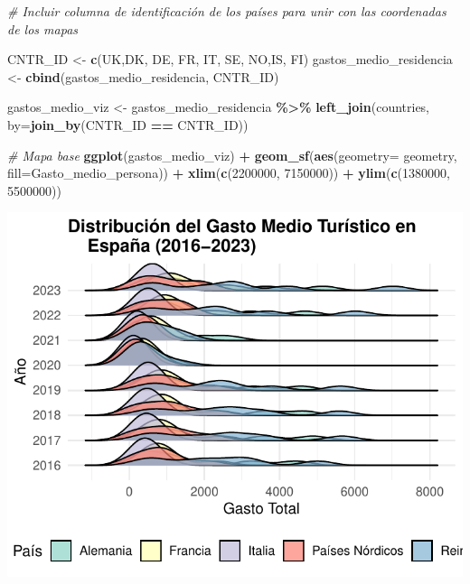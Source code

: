 \documentclass[data,article,submit,moreauthors,pdftex]{Definitions/mdpi}
\newenvironment{Shaded}{\begin{snugshade}}{\end{snugshade}}
\newcommand{\AttributeTok}[1]{\textcolor[rgb]{0.13,0.29,0.53}{#1}}
\newcommand{\CommentTok}[1]{\textcolor[rgb]{0.56,0.35,0.01}{\textit{#1}}}
\newcommand{\DecValTok}[1]{\textcolor[rgb]{0.00,0.00,0.81}{#1}}
\newcommand{\FunctionTok}[1]{\textcolor[rgb]{0.13,0.29,0.53}{\textbf{#1}}}
\newcommand{\NormalTok}[1]{#1}
\newcommand{\OtherTok}[1]{\textcolor[rgb]{0.56,0.35,0.01}{#1}}
\newcommand{\SpecialCharTok}[1]{\textcolor[rgb]{0.81,0.36,0.00}{\textbf{#1}}}
\newcommand{\StringTok}[1]{\textcolor[rgb]{0.31,0.60,0.02}{#1}}
\begin{document}
\begin{Shaded}
\begin{Highlighting}[]
\CommentTok{\# Incluir columna de identificación de los países para unir con las coordenadas de los mapas}

\NormalTok{CNTR\_ID }\OtherTok{\textless{}{-}} \FunctionTok{c}\NormalTok{(}\StringTok{\textquotesingle{}UK\textquotesingle{}}\NormalTok{,}\StringTok{\textquotesingle{}DK\textquotesingle{}}\NormalTok{, }\StringTok{\textquotesingle{}DE\textquotesingle{}}\NormalTok{, }\StringTok{\textquotesingle{}FR\textquotesingle{}}\NormalTok{, }\StringTok{\textquotesingle{}IT\textquotesingle{}}\NormalTok{, }\StringTok{\textquotesingle{}SE\textquotesingle{}}\NormalTok{, }\StringTok{\textquotesingle{}NO\textquotesingle{}}\NormalTok{,}\StringTok{\textquotesingle{}IS\textquotesingle{}}\NormalTok{, }\StringTok{\textquotesingle{}FI\textquotesingle{}}\NormalTok{)}
\NormalTok{gastos\_medio\_residencia }\OtherTok{\textless{}{-}} \FunctionTok{cbind}\NormalTok{(gastos\_medio\_residencia, CNTR\_ID)}


\NormalTok{gastos\_medio\_viz }\OtherTok{\textless{}{-}}\NormalTok{ gastos\_medio\_residencia }\SpecialCharTok{\%\textgreater{}\%} \FunctionTok{left\_join}\NormalTok{(countries, }\AttributeTok{by=}\FunctionTok{join\_by}\NormalTok{(CNTR\_ID }\SpecialCharTok{==}\NormalTok{ CNTR\_ID))}



\CommentTok{\# Mapa base }
\FunctionTok{ggplot}\NormalTok{(gastos\_medio\_viz) }\SpecialCharTok{+}
  \FunctionTok{geom\_sf}\NormalTok{(}\FunctionTok{aes}\NormalTok{(}\AttributeTok{geometry=}\NormalTok{ geometry, }\AttributeTok{fill=}\NormalTok{Gasto\_medio\_persona)) }\SpecialCharTok{+}
  \FunctionTok{xlim}\NormalTok{(}\FunctionTok{c}\NormalTok{(}\DecValTok{2200000}\NormalTok{, }\DecValTok{7150000}\NormalTok{)) }\SpecialCharTok{+}
  \FunctionTok{ylim}\NormalTok{(}\FunctionTok{c}\NormalTok{(}\DecValTok{1380000}\NormalTok{, }\DecValTok{5500000}\NormalTok{))}
\end{Highlighting}
\end{Shaded}

\includegraphics{ProyectoAED2024_Rmd_files/figure-latex/unnamed-chunk-25-1.pdf}
\end{document}
